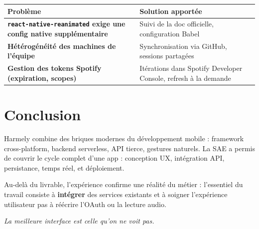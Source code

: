 \documentclass[11pt,a4paper]{article}
\begin{document}
\begin{tabularx}{\linewidth}{@{}>{\bfseries}p{4cm} X@{}}
\toprule
\rowcolor{light} Problème & Solution apportée \\ \midrule
\texttt{react-native-reanimated} exige une config native supplémentaire & Suivi de la doc officielle, configuration Babel \\
Hétérogénéité des machines de l'équipe & Synchronisation via GitHub, sessions partagées \\
Gestion des tokens Spotify (expiration, scopes) & Itérations dans Spotify Developer Console, refresh à la demande \\
\bottomrule
\end{tabularx}

\section{Conclusion}

Harmely combine des briques modernes du développement mobile : framework cross-platform, backend serverless, API tierce, gestures naturels. La SAE a permis de couvrir le cycle complet d'une app : conception UX, intégration API, persistance, temps réel, et déploiement.

\medskip
Au-delà du livrable, l'expérience confirme une réalité du métier : l'essentiel du travail consiste à \textbf{intégrer} des services existants et à soigner l'expérience utilisateur \textemdash{} pas à réécrire l'OAuth ou la lecture audio.

\vspace{0.5cm}
\begin{center}
{\sffamily\itshape\color{midgray}\large
\og La meilleure interface est celle qu'on ne voit pas. \fg{}}
\end{center}
\end{document}
